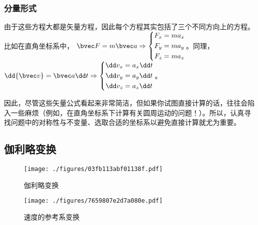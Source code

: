 \subsubsection{分量形式}
由于这些方程大都是矢量方程，因此每个方程其实包括了三个不同方向上的方程。比如在直角坐标系中，
$\bvec F = m \bvec a
\Rightarrow
\left \{
\begin{aligned}
F_x &= m a_x \\
F_y &= m a_y \\
F_z &= m a_z \\
\end{aligned}
\right .
$。同理，
$\dd {\bvec v} = \bvec a \dd t
\Rightarrow
\left \{
\begin{aligned}
\dd v_x &= a_x \dd t\\
\dd v_y &= a_y \dd t\\
\dd v_z &= a_z \dd t\\
\end{aligned}
\right .
$。

因此，尽管这些矢量公式看起来非常简洁，但如果你试图直接计算的话，往往会陷入一些麻烦（例如，在直角坐标系下计算有关圆周运动的问题！）。所以，认真寻找问题中的对称性与不变量、选取合适的坐标系以避免直接计算就尤为重要。

\subsection{伽利略变换}
\begin{figure}[ht]
\centering
\texttt{[image: ./figures/03fb113abf01138f.pdf]}
\caption{伽利略变换} \label{fig_MPAB_5}
\end{figure}

\begin{figure}[ht]
\centering
\texttt{[image: ./figures/7659807e2d7a080e.pdf]}
\caption{速度的参考系变换} \label{fig_MPAB_6}
\end{figure}

